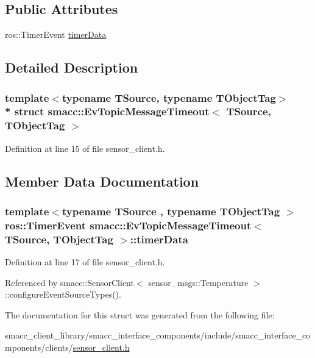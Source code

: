 \subsection*{Public Attributes}
\begin{DoxyCompactItemize}
\item 
ros\+::\+Timer\+Event \hyperlink{structsmacc_1_1EvTopicMessageTimeout_ad2609ece9742ef84c32160309b1b0f15}{timer\+Data}
\end{DoxyCompactItemize}


\subsection{Detailed Description}
\subsubsection*{template$<$typename T\+Source, typename T\+Object\+Tag$>$\\*
struct smacc\+::\+Ev\+Topic\+Message\+Timeout$<$ T\+Source, T\+Object\+Tag $>$}



Definition at line 15 of file sensor\+\_\+client.\+h.



\subsection{Member Data Documentation}
\subsubsection[{\texorpdfstring{timer\+Data}{timerData}}]{\setlength{\rightskip}{0pt plus 5cm}template$<$typename T\+Source , typename T\+Object\+Tag $>$ ros\+::\+Timer\+Event {\bf smacc\+::\+Ev\+Topic\+Message\+Timeout}$<$ T\+Source, T\+Object\+Tag $>$\+::timer\+Data}\hypertarget{structsmacc_1_1EvTopicMessageTimeout_ad2609ece9742ef84c32160309b1b0f15}{}\label{structsmacc_1_1EvTopicMessageTimeout_ad2609ece9742ef84c32160309b1b0f15}


Definition at line 17 of file sensor\+\_\+client.\+h.



Referenced by smacc\+::\+Sensor\+Client$<$ sensor\+\_\+msgs\+::\+Temperature $>$\+::configure\+Event\+Source\+Types().



The documentation for this struct was generated from the following file\+:\begin{DoxyCompactItemize}
\item 
smacc\+\_\+client\+\_\+library/smacc\+\_\+interface\+\_\+components/include/smacc\+\_\+interface\+\_\+components/clients/\hyperlink{sensor__client_8h}{sensor\+\_\+client.\+h}\end{DoxyCompactItemize}
